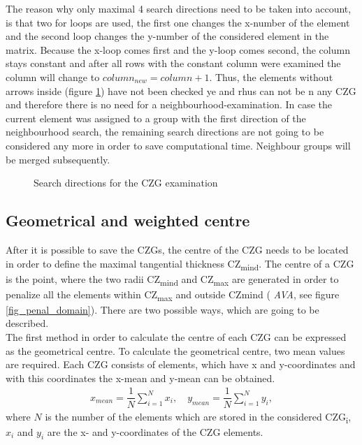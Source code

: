        The reason why only maximal 
       4 search directions need to be taken into account,
       is that two for loops are used, the first one changes the x-number 
       of the element
       and the second loop changes the y-number of the considered element
       in the matrix. 
       Because the x-loop comes first and the y-loop comes second, the column 
       stays constant and after all rows with the constant column
       were examined the column will change to $column_{new} = column +1$.
       Thus, the elements without arrows inside
       (figure \ref{fig_look_around})
        have not been checked ye and rhus can not be
        n any CZG and therefore 
       there is no need for a neighbourhood-examination. In case the
       current element was assigned to a group with the
       first direction of the neighbourhood search, the remaining
       search directions are not going to be considered any more
       in order to save computational time. Neighbour groups will
       be merged subsequently. 
            \begin{figure}[!h]
 \centering
 \def\svgwidth{0.45\textwidth}
 
 \caption{Search directions for the CZG examination }    %
 \label{fig_look_around}          %
      \end{figure}

       \subsection{Geometrical and weighted centre}
       \label{subsection_geometrical_weighted}
       After it is possible to save the CZGs, the centre of the CZG needs to be 
       located
       in order to define the maximal tangential thickness 
       CZ\textsubscript{mind}.
       The centre of a 
       CZG is the point, where the two radii
       CZ\textsubscript{mind} and CZ\textsubscript{max} are
       generated in order to penalize all the elements
       within CZ\textsubscript{max} and outside CZ\textsubscript{}mind
       ( \emph{AVA}, see figure \ref{fig_penal_domain}).
       There are two possible ways, which are going to be described.\\
       
       The first method in order to calculate the centre of
       each CZG can be expressed as 
       the geometrical centre. To calculate the geometrical centre, two mean 
       values are required. Each CZG consists of elements, which
       have x and y-coordinates and with this coordinates the x-mean
       and y-mean can be obtained.
       \begin{align*}
       x_{mean} = \dfrac{1}{N} \sum_{i=1}^N x_i, \quad 
       y_{mean} = \dfrac{1}{N} \sum_{i=1}^N y_i,
       \end{align*}
       where \textbf{$N$} is the number of the elements which are stored
       in the considered CZG\textsubscript{i}, 
       \textbf{$x_i$} and \textbf{$y_i$} are the x- and 
       y-coordinates of the CZG elements.\\
       
